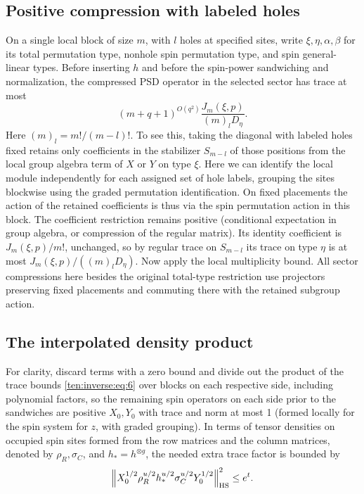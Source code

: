 \subsection{Positive compression with labeled holes}
On a single local block of size \(m\), with \(l\) holes at specified sites, write \(\xi,\eta,\alpha,\beta\) for its total permutation type, nonhole spin permutation type, and spin general-linear types. Before inserting \(h\) and before the spin-power sandwiching and normalization, the compressed PSD operator in the selected sector has trace at most
\begin{equation}
 (m+q+1)^{O(q^2)}
 \frac{J_m(\xi,p)}{(m)_l D_\eta}.
 \label{ten:inverse:eq:6}
\end{equation}
Here \((m)_l=m!/(m-l)!\). To see this, taking the diagonal with labeled holes fixed retains only coefficients in the stabilizer \(S_{m-l}\) of those positions from the local group algebra term of \(X\) or \(Y\) on type \(\xi\). Here we can identify the local module independently for each assigned set of hole labels, grouping the sites blockwise using the graded permutation identification. On fixed placements the action of the retained coefficients is thus via the spin permutation action in this block. The coefficient restriction remains positive (conditional expectation in group algebra, or compression of the regular matrix). Its identity coefficient is \(J_m(\xi,p)/m!\), unchanged, so by regular trace on \(S_{m-l}\) its trace on type \(\eta\) is at most \(J_m(\xi,p)/((m)_l D_\eta)\). Now apply the local multiplicity bound. All sector compressions here besides the original total-type restriction use projectors preserving fixed placements and commuting there with the retained subgroup action.

\subsection{The interpolated density product}
For clarity, discard terms with a zero bound and divide out the product of the trace bounds \eqref{ten:inverse:eq:6} over blocks on each respective side, including polynomial factors, so the remaining spin operators on each side prior to the sandwiches are positive \(X_0,Y_0\) with trace and norm at most 1 (formed locally for the spin system for \(z\), with graded grouping). In terms of tensor densities on occupied spin sites formed from the row matrices and the column matrices, denoted by \(\rho_R,\sigma_C\), and \(h_* = h^{\otimes g}\), the needed extra trace factor is bounded by
\begin{equation}
 \left\| X_0^{1/2}\rho_R^{u/2} h_*^{u/2}\sigma_C^{u/2}Y_0^{1/2}\right\|_{\rm HS}^2
 \le e^t .
 \label{ten:inverse:eq:7}
\end{equation}
